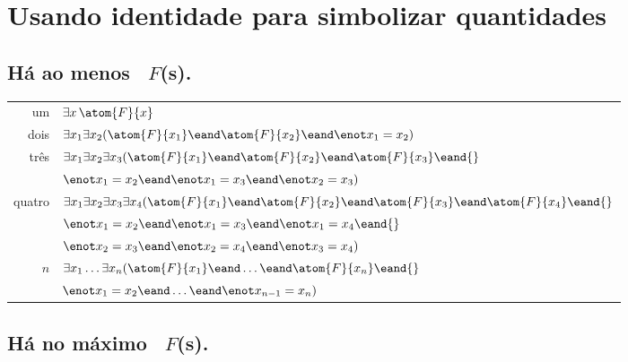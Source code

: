 
\newpage
\section{Usando identidade para simbolizar quantidades}

\subsection*{Há ao menos \blank\ $F$(s).}
\label{summary.atleast}

\begin{tabular*}{\textwidth}{rl}
um & $\exists x\,\atom{F}{x}$\\
dois & $\exists x_1\exists x_2(\atom{F}{x_1} \eand \atom{F}{x_2} \eand \enot x_1  = x_2)$\\
três & $\exists x_1\exists x_2\exists x_3(\atom{F}{x_1} \eand \atom{F}{x_2} \eand \atom{F}{x_3} \eand {}$\\
& $\enot x_1 = x_2 \eand\enot x_1 = x_3 \eand \enot x_2 = x_3)$\\
quatro & $\exists x_1\exists x_2\exists x_3\exists x_4 (\atom{F}{x_1} \eand \atom{F}{x_2} \eand \atom{F}{x_3} \eand \atom{F}{x_4} \eand {}$\\
& $\enot x_1 = x_2 \eand \enot x_1 = x_3 \eand \enot x_1 = x_4 \eand {}$\\
& $ \enot x_2 = x_3 \eand \enot x_2 = x_4 \eand \enot x_3 = x_4)$\\
$n$ & $\exists x_1\ldots\exists x_n(\atom{F}{x_1} \eand \ldots \eand \atom{F}{x_n} \eand {}$\\
& $\enot x_1 = x_2 \eand\ldots\eand \enot x_{n-1} = x_n)$ 
\end{tabular*}

\subsection*{Há no máximo \blank\ $F$(s).}
\label{summary.atmost}


